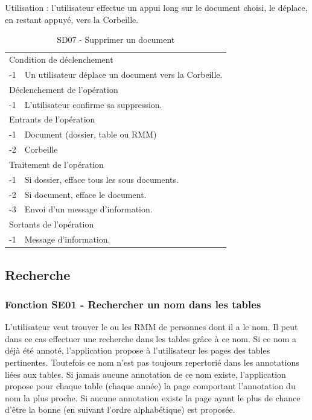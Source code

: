 \documentclass[a4paper]{article}
\begin{document}
Utilisation : l'utilisateur effectue un appui long sur le document choisi, le déplace, en restant appuyé, vers la Corbeille.

\begin{table}[H]
  \centering
   \small
	\begin{tabular}{|c|p{12cm}|}
   		\hline
   			\rowcolor{lightgray}\multicolumn{2}{|c|}{\textbf{SD07 - Supprimer un document}} \\
   		\hline
   			\multicolumn{2}{|l|}{Condition de d\'eclenchement} \\
   		\hline
   			-1 & Un utilisateur déplace un document vers la Corbeille.\\
   		\hline
   			\multicolumn{2}{|l|}{D\'eclenchement de l'op\'eration} \\
   		\hline
   			-1 & L'utilisateur confirme sa suppression.\\
   		\hline
   			\multicolumn{2}{|l|}{Entrants de l'op\'eration} \\
   		\hline
   			-1 & Document (dossier, table ou RMM)\\
        		-2 & Corbeille\\
   		\hline
   			\multicolumn{2}{|l|}{Traitement de l'op\'eration} \\
  		\hline
   			-1 & Si dossier, efface tous les sous documents. \\
			-2 & Si document, efface le document. \\
			-3 & Envoi d'un message d'information. \\		
		\hline
   			\multicolumn{2}{|l|}{Sortants de l'op\'eration} \\
   		\hline
   			-1 & Message d'information. \\
   		\hline
	\end{tabular}
  \caption{SD07 - Supprimer un document}
  \normalsize
  \label{tab:supprimer_document}
\end{table}

\subsection{Recherche}

\subsubsection{Fonction SE01 - Rechercher un nom dans les tables}

L'utilisateur veut trouver le ou les RMM de personnes dont il a le nom. Il peut dans ce cas effectuer une recherche dans les tables grâce à ce nom. Si ce nom a déjà été annoté, l'application propose à l'utilisateur les pages des tables pertinentes. Toutefois ce nom n'est pas toujours repertorié dans les annotations liées aux tables. Si jamais aucune annotation de ce nom existe, l'application propose pour chaque table (chaque année) la page comportant l'annotation du nom la plus proche. Si aucune annotation existe la page ayant le plus de chance d'être la bonne (en suivant l'ordre alphabétique) est proposée.
\\
\end{document}
